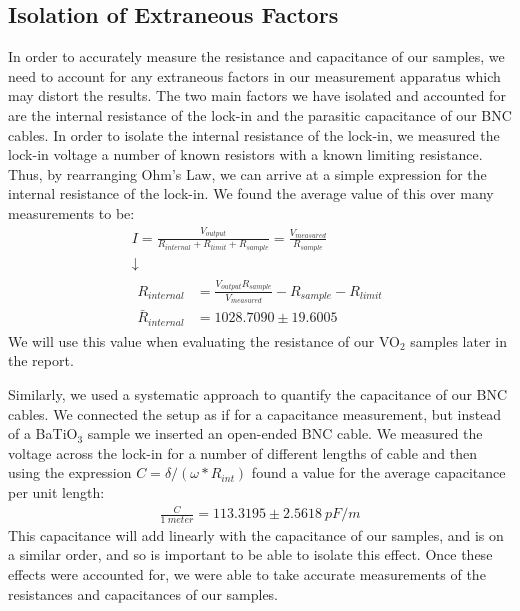 \documentclass[%
 reprint,
 amsmath,amssymb,
 aps,
 pra,
]{revtex4-1}
\begin{document}
\subsection{Isolation of Extraneous Factors}\label{section:factors}

In order to accurately measure the resistance and capacitance of our samples, we need to account for any extraneous factors in our measurement apparatus which may distort the results. The two main factors we have isolated and accounted for are the internal resistance of the lock-in and the parasitic capacitance of our BNC cables. In order to isolate the internal resistance of the lock-in, we measured the lock-in voltage a number of known resistors with a known limiting resistance. Thus, by rearranging Ohm's Law, we can arrive at a simple expression for the internal resistance of the lock-in. We found the average value of this over many measurements to be:
\begin{gather}
	I = \frac{V_{output}}{R_{internal} + R_{limit} + R_{sample}} = \frac{V_{measured}}{R_{sample}} \nonumber \\
	\downarrow \nonumber \\
	\begin{align}
		R_{internal} 		& = \frac{V_{output}R_{sample}}{V_{measured}} - R_{sample} - R_{limit} \nonumber \\
		\bar{R}_{internal} 	& = 1028.7090 \pm 19.6005 \nonumber
	\end{align}
\end{gather}
We will use this value when evaluating the resistance of our VO$_2$ samples later in the report.

Similarly, we used a systematic approach to quantify the capacitance of our BNC cables. We connected the setup as if for a capacitance measurement, but instead of a BaTiO$_3$ sample we inserted an open-ended BNC cable. We measured the voltage across the lock-in for a number of different lengths of cable and then using the expression $C = \delta/(\omega*R_{int})$ found a value for the average capacitance per unit length:
\begin{gather}
	\frac{C}{1~meter} = 113.3195 \pm 2.5618~pF/m \nonumber
\end{gather}
This capacitance will add linearly with the capacitance of our samples, and is on a similar order, and so is important to be able to isolate this effect. Once these effects were accounted for, we were able to take accurate measurements of the resistances and capacitances of our samples.
\end{document}
